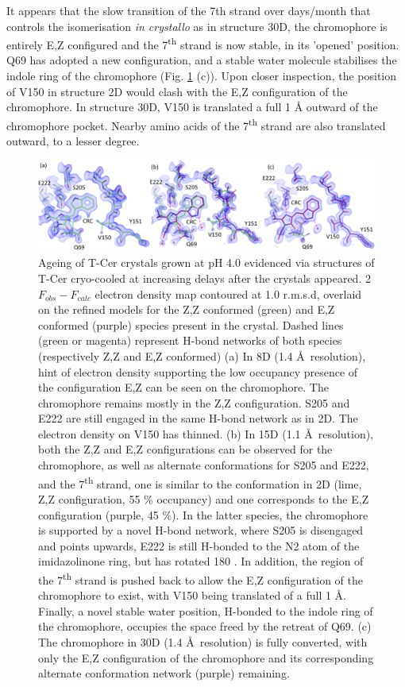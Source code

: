 It appears that the slow transition of the 7th strand over days/month that controls the isomerisation \textit{in crystallo} as in structure 30D, the chromophore is entirely E,Z configured and the 7\textsuperscript{th} strand is now stable, in its 'opened' position. Q69 has adopted a new configuration, and a stable water molecule stabilises the indole ring of the chromophore (Fig. \ref{fig:ageing_struc} (c)). Upon closer inspection, the position of V150 in structure 2D would clash with the E,Z configuration of the chromophore. In structure 30D, V150 is translated a full 1 Å outward of the chromophore pocket. Nearby amino acids of the 7\textsuperscript{th} strand are also translated outward, to a lesser degree. 
\begin{figure}[H] %
    \centering
        \noindent \includegraphics[width=\textwidth]{images/T-Cer/ageing_struc.pdf}
    \hfill
    \caption{Ageing of T-Cer crystals grown at pH 4.0 evidenced via structures of T-Cer cryo-cooled at increasing delays after the crystals appeared. 2\(F_{obs} - F_{calc}\) electron density map contoured at 1.0 r.m.s.d, overlaid on the refined models for the Z,Z conformed (green) and E,Z conformed (purple) species present in the crystal. Dashed lines (green or magenta) represent H-bond networks of both species (respectively Z,Z and E,Z conformed) (a) In 8D (1.4 \AA\ resolution), hint of electron density supporting the low occupancy presence of the configuration E,Z can be seen on the chromophore. The chromophore remains mostly in the Z,Z configuration. S205 and E222 are still engaged in the same H-bond network as in 2D. The electron density on V150 has thinned. (b) In 15D (1.1 \AA\ resolution), both the Z,Z and E,Z configurations can be observed for the chromophore, as well as alternate conformations for S205 and E222, and the 7\textsuperscript{th} strand, one is similar to the conformation in 2D (lime, Z,Z configuration, 55 \% occupancy) and one corresponds to the E,Z configuration (purple, 45 \%). In the latter species, the chromophore is supported by a novel H-bond network, where S205 is disengaged and points upwards, E222 is still H-bonded to the N2 atom of the imidazolinone ring, but has rotated 180 \degree. In addition, the region of the 7\textsuperscript{th} strand is pushed back to allow the E,Z configuration of the chromophore to exist, with V150 being translated of a full 1 \AA. Finally, a novel stable water position, H-bonded to the indole ring of the chromophore, occupies the space freed by the retreat of Q69. (c) The chromophore in 30D (1.4 \AA\ resolution) is fully converted, with only the E,Z configuration of the chromophore and its corresponding alternate conformation network (purple) remaining.}
    \label{fig:ageing_struc}
\end{figure}

